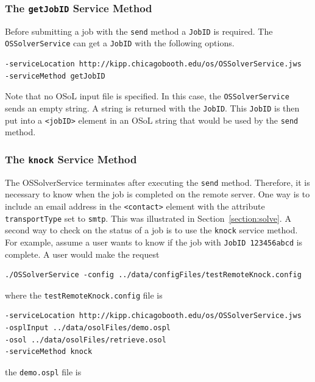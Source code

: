 \documentclass[11pt]{article}
\renewcommand{\_}{{\char"5F}}
\renewcommand{\{}{{\char"7B}}
\renewcommand{\}}{{\char"7D}}
\renewcommand{\^}{{\char"0D}}
\renewcommand{\'}{{\char"0D}}
\begin{document}
\begin{enumerate}[Step 1:]
\subsubsection{The  {\tt getJobID} Service Method}\label{section:getjobid}

Before  submitting a job with the {\tt send} method a {\tt JobID}
is required. The {\tt OSSolverService} can get a {\tt JobID} with the following options.
\begin{verbatim}
-serviceLocation http://kipp.chicagobooth.edu/os/OSSolverService.jws
-serviceMethod getJobID
\end{verbatim}
Note that no OSoL input file is specified. In this case, the {\tt OSSolverService} sends an empty string.
A string is returned with the {\tt JobID}. This {\tt JobID} is then put into a {\tt <jobID>} element in an
OSoL string that would be used by the {\tt send} method.


\subsubsection{The  {\tt knock} Service Method}\label{section:knock}

The OSSolverService terminates after executing the {\tt send} method. Therefore,
it is necessary to know when the job is completed on the remote server. One way is to include an email
address in the  {\tt <contact>}  element with the attribute {\tt transportType} set to {\tt smtp}.
This was illustrated in Section~\ref{section:solve}.  A second way to check on the status of a job is
to use the {\tt knock} service method.  For example, assume a user   wants to know if  the job
with {\tt JobID 123456abcd}  is complete. A user would make the request
\begin{verbatim}
./OSSolverService -config ../data/configFiles/testRemoteKnock.config
\end{verbatim}
where the {\tt testRemoteKnock.config} file is
\begin{verbatim}
-serviceLocation http://kipp.chicagobooth.edu/os/OSSolverService.jws
-osplInput ../data/osolFiles/demo.ospl
-osol ../data/osolFiles/retrieve.osol
-serviceMethod knock
\end{verbatim}
the {\tt demo.ospl} file is



\end{enumerate}
\end{document}
